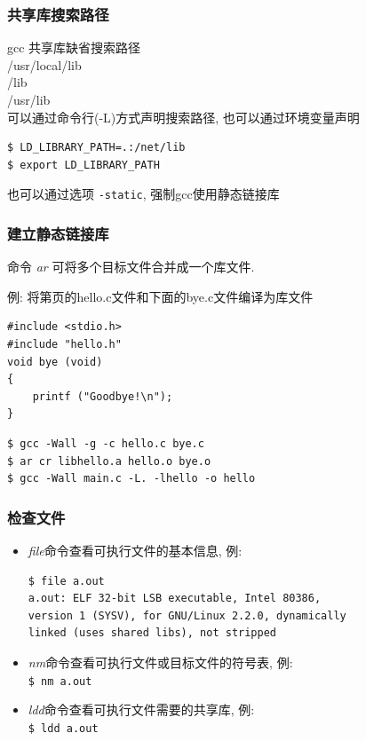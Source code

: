 \documentclass[compress]{beamer}
\begin{document}
\begin{frame}[fragile]
\frametitle{共享库搜索路径}

gcc 共享库缺省搜索路径\\
/usr/local/lib \\
/lib \\
/usr/lib \\
可以通过命令行(-L)方式声明搜索路径, 也可以通过环境变量声明\\
\begin{Verbatim}
$ LD_LIBRARY_PATH=.:/net/lib
$ export LD_LIBRARY_PATH
\end{Verbatim}
也可以通过选项 \verb~-static~, 强制gcc使用静态链接库


\end{frame}


\begin{frame}[fragile]
\frametitle{建立静态链接库}

\noindent 命令 \emph{ar} 可将多个目标文件合并成一个库文件.

\noindent 例: 将第\pageref{multifile}页的hello.c文件和下面的bye.c文件编译为库文件\\
\begin{lstlisting}
#include <stdio.h>
#include "hello.h"
void bye (void)
{
    printf ("Goodbye!\n");
}
\end{lstlisting}

\begin{verbatim}
$ gcc -Wall -g -c hello.c bye.c
$ ar cr libhello.a hello.o bye.o
$ gcc -Wall main.c -L. -lhello -o hello
\end{verbatim}
\end{frame}

\begin{frame}[fragile]
\frametitle{检查文件}

\begin{itemize}
\item \emph{file}命令查看可执行文件的基本信息, 例:
  {\small
\begin{Verbatim}
$ file a.out
a.out: ELF 32-bit LSB executable, Intel 80386,
version 1 (SYSV), for GNU/Linux 2.2.0, dynamically
linked (uses shared libs), not stripped
\end{Verbatim}
}

\item \emph{nm}命令查看可执行文件或目标文件的符号表, 例:\\
\verb~$ nm a.out~

\item \emph{ldd}命令查看可执行文件需要的共享库, 例:\\
\verb~$ ldd a.out~

\end{itemize}

\end{frame}
\end{document}
